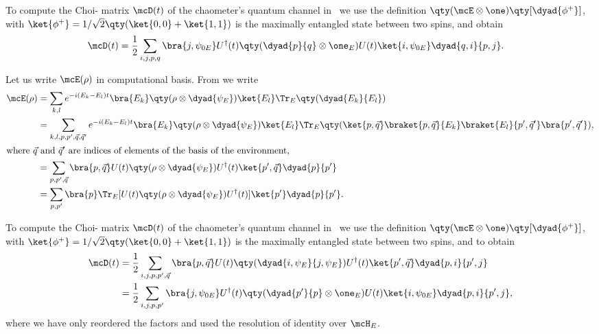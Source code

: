 To compute the Choi-\jami{} matrix $\mcD(t)$ of the chaometer's quantum channel 
in~ we use the definition 
$\qty(\mcE \otimes \one) \qty[\dyad{\phi^+}]$, with $\ket{\phi^+}=1/\sqrt{2}\qty(\ket{0,0} + \ket{1,1})$
is the maximally entangled state between two spins, and obtain
\begin{align}\label{eq:choi:chaometer}
\mcD(t) &= 
\frac{1}{2}
\sum_{i,j,p,q}
\bra{j, \psi_{0E}} U^\dagger(t) \qty( \dyad{p}{q}\otimes \one_E ) U(t)
\ket{i, \psi_{0E}} \dyad{q,i}{p,j}.
\end{align}

Let us write $\mcE(\rho)$ in computational basis. From 
we write
\begin{align}
\mcE(\rho) &= 
\sum_{k,l} 
e^{-i (E_k - E_l)t}
\bra{E_k}  \qty(\rho \otimes \dyad{\psi_{E}}) \ket{E_l} \Tr_E \qty(\dyad{E_k}{E_l})\\
&= 
\sum_{k,l, p, p', \vec q, \vec q'}
e^{-i (E_k - E_l)t}
\bra{E_k} 
\qty(\rho \otimes \dyad{\psi_{E}}) 
\ket{E_l} 
\Tr_E \qty( \ket{p,\vec q} \braket{p,\vec q}{E_k} 
\braket{E_l}{p', \vec q'} \bra{p', \vec q'}), \\
\intertext{where $\vec q$ and $\vec q'$ are indices of elements of the 
basis of the environment,}
&= 
\sum_{p, p', \vec q}
\bra{p, \vec q}
U(t) \qty(\rho \otimes \dyad{\psi_{E}}) U^\dagger(t)
\ket{p', \vec q}
\dyad{p}{p'} \\
&= \label{eq:chaometer:channel:2}
\sum_{p, p'}
\bra{p}
\Tr_E[U(t) \qty(\rho \otimes \dyad{\psi_{E}}) U^\dagger(t) ]
\ket{p'}
\dyad{p}{p'}.
\end{align}

To compute the Choi-\jami{} matrix $\mcD(t)$ of the chaometer's quantum channel 
in~ we use the definition 
$\qty(\mcE \otimes \one) \qty[\dyad{\phi^+}]$, with $\ket{\phi^+}=1/\sqrt{2}\qty(\ket{0,0} + \ket{1,1})$
is the maximally entangled state between two spins, and  to obtain
\begin{align}
\mcD(t) &=  
\frac{1}{2} 
\sum_{i, j, p, p', \vec q}
\bra{p, \vec q}
U(t) \qty(\dyad{i,\psi_{E}}{j,\psi_{E}}) U^\dagger(t)
\ket{p', \vec q}
\dyad{p,i}{p',j} \\
&= \label{eq:choi:chaometer:computational:basis}
\frac{1}{2}
\sum_{i, j, p, p'}
\bra{j, \psi_{0E}} U^\dagger(t) \qty( \dyad{p'}{p}\otimes \one_E ) U(t)
\ket{i, \psi_{0E}} \dyad{p, i}{p', j},
\end{align}
where we have only reordered the factors and used the resolution of identity over 
$\mcH_E$.

